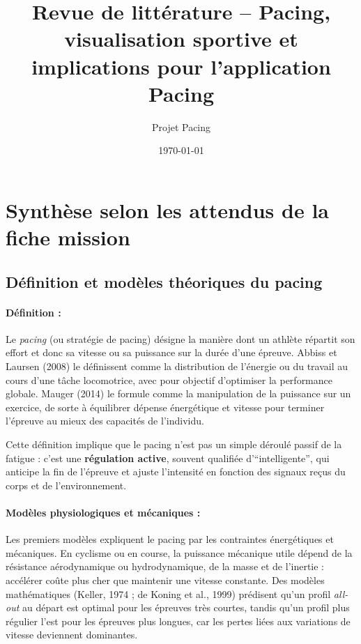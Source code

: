 \documentclass[11pt,a4paper]{article}
\title{Revue de littérature -- Pacing, visualisation sportive et implications pour l'application Pacing}
\author{Projet Pacing}
\date{\today}
\begin{document}
\maketitle



\section{Synthèse selon les attendus de la fiche mission}

\subsection{Définition et modèles théoriques du pacing}

\paragraph{Définition :}
Le \textit{pacing} (ou stratégie de pacing) désigne la manière dont un athlète répartit son effort et donc sa vitesse ou sa puissance sur la durée d'une épreuve. Abbiss et Laursen (2008) le définissent comme la distribution de l'énergie ou du travail au cours d'une tâche locomotrice, avec pour objectif d'optimiser la performance globale. Mauger (2014) le formule comme la manipulation de la puissance sur un exercice, de sorte à équilibrer dépense énergétique et vitesse pour terminer l'épreuve au mieux des capacités de l'individu.

Cette définition implique que le pacing n'est pas un simple déroulé passif de la fatigue : c'est une \textbf{régulation active}, souvent qualifiée d'``intelligente'', qui anticipe la fin de l'épreuve et ajuste l'intensité en fonction des signaux reçus du corps et de l'environnement.

\paragraph{Modèles physiologiques et mécaniques :}
Les premiers modèles expliquent le pacing par les contraintes énergétiques et mécaniques. En cyclisme ou en course, la puissance mécanique utile dépend de la résistance aérodynamique ou hydrodynamique, de la masse et de l'inertie : accélérer coûte plus cher que maintenir une vitesse constante. Des modèles mathématiques (Keller, 1974 ; de Koning et al., 1999) prédisent qu'un profil \textit{all-out} au départ est optimal pour les épreuves très courtes, tandis qu'un profil plus régulier l'est pour les épreuves plus longues, car les pertes liées aux variations de vitesse deviennent dominantes.
\end{document}

